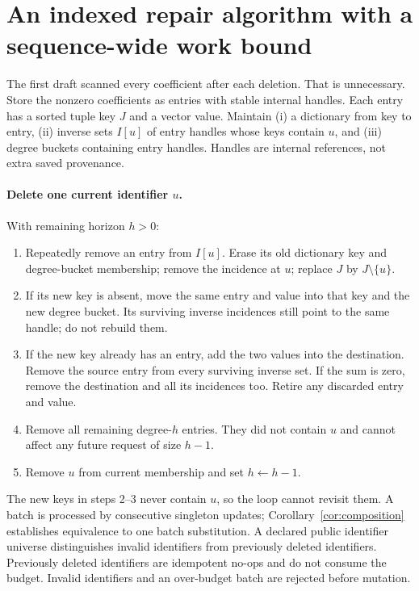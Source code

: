\documentclass[11pt,a4paper]{article}
\theoremstyle{definition}\newtheorem{definition}[theorem]{Definition}
\newcommand{\minus}{\setminus}
\begin{document}
\section{An indexed repair algorithm with a sequence-wide work bound}\label{sec:indexed}
The first draft scanned every coefficient after each deletion. That is unnecessary. Store the nonzero coefficients as entries with stable internal handles. Each entry has a sorted tuple key $J$ and a vector value. Maintain (i) a dictionary from key to entry, (ii) inverse sets $I[u]$ of entry handles whose keys contain $u$, and (iii) degree buckets containing entry handles. Handles are internal references, not extra saved provenance.

\paragraph{Delete one current identifier $u$.} With remaining horizon $h>0$:
\begin{enumerate}
\item Repeatedly remove an entry from $I[u]$. Erase its old dictionary key and degree-bucket membership; remove the incidence at $u$; replace $J$ by $J\minus\{u\}$.
\item If its new key is absent, move the same entry and value into that key and the new degree bucket. Its surviving inverse incidences still point to the same handle; do not rebuild them.
\item If the new key already has an entry, add the two values into the destination. Remove the source entry from every surviving inverse set. If the sum is zero, remove the destination and all its incidences too. Retire any discarded entry and value.
\item Remove all remaining degree-$h$ entries. They did not contain $u$ and cannot affect any future request of size $h-1$.
\item Remove $u$ from current membership and set $h\leftarrow h-1$.
\end{enumerate}
The new keys in steps 2--3 never contain $u$, so the loop cannot revisit them. A batch is processed by consecutive singleton updates; Corollary~\ref{cor:composition} establishes equivalence to one batch substitution. A declared public identifier universe distinguishes invalid identifiers from previously deleted identifiers. Previously deleted identifiers are idempotent no-ops and do not consume the budget. Invalid identifiers and an over-budget batch are rejected before mutation.
\end{document}
